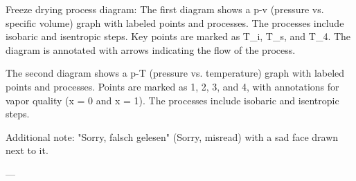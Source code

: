 Freeze drying process diagram:  
The first diagram shows a p-v (pressure vs. specific volume) graph with labeled points and processes. The processes include isobaric and isentropic steps. Key points are marked as T_i, T_s, and T_4. The diagram is annotated with arrows indicating the flow of the process.  

The second diagram shows a p-T (pressure vs. temperature) graph with labeled points and processes. Points are marked as 1, 2, 3, and 4, with annotations for vapor quality (x = 0 and x = 1). The processes include isobaric and isentropic steps.  

Additional note: "Sorry, falsch gelesen" (Sorry, misread) with a sad face drawn next to it.  

---